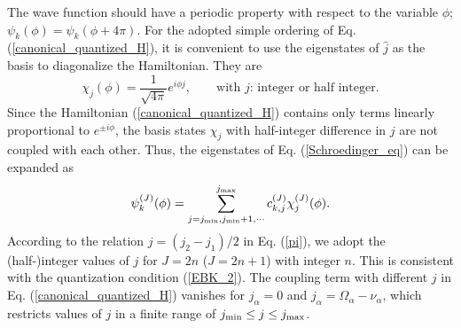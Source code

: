 \documentclass[11pt]{book} %
\begin{document}
The wave function should have a periodic property with respect to
the variable $\phi$;
$\psi_k(\phi)=\psi_k(\phi+4\pi)$.
For the adopted simple ordering of Eq. (\ref{canonical_quantized_H}),
it is convenient to use the eigenstates of $\hat{j}$ as the basis
to diagonalize the Hamiltonian.
They are
\begin{equation}
	\chi_j(\phi) = \frac{1}{\sqrt{4\pi}} e^{i\phi j} ,
	\quad\quad\mbox{with $j$: integer or half integer} .
\end{equation}
Since the Hamiltonian (\ref{canonical_quantized_H}) contains only
terms linearly proportional to $e^{\pm i\phi}$,
the basis states $\chi_j$ with half-integer difference in $j$
are not coupled with each other.
Thus, the eigenstates of Eq. (\ref{Schroedinger_eq}) can be expanded as
\begin{equation}
	\psi_k^{(J)}(\phi) = 
	\sum_{j=j_{\rm min},j_{\rm min}+1,\cdots}^{j_{\rm max}}
	c_{k,j}^{(J)} \chi_j^{(J)}(\phi) .
	\label{CQ_eigenstate}
\end{equation}
According to the relation $j=(j_2-j_1)/2$ in Eq. (\ref{pi}),
we adopt the (half-)integer values of $j$ for $J=2n$ ($J=2n+1$)
with integer $n$.
This is consistent with the quantization condition (\ref{EBK_2}).
The coupling term with different $j$
in Eq. (\ref{canonical_quantized_H}) vanishes
for $j_{\alpha}=0$ and $j_{\alpha}=\Omega_{\alpha}-\nu_{\alpha}$,
which restricts values of $j$ in a finite range of
$j_{\rm min}\leq j \leq j_{\rm max}$.
\end{document}
